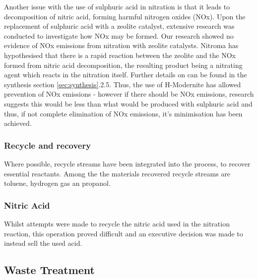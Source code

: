 Another issue with the use of sulphuric acid in nitration is that it leads to decomposition of nitric acid, forming harmful nitrogen oxides (NOx). Upon the replacement of sulphuric acid with a zeolite catalyst, extensive research was conducted to investigate how NOx may be formed. Our research showed no evidence of NOx emissions from nitration with zeolite catalysts. Nitroma has hypothesised that there is a rapid reaction between the zeolite and the NOx formed from nitric acid decomposition, the resulting product being a nitrating agent which reacts in the nitration itself. Further details on can be found in the synthesis section \ref{sec:synthesis}.2.5. Thus, the use of H-Modernite has allowed prevention of NOx emissions - however if there should be NOx emissions, research suggests this would be less than what would be produced with sulphuric acid and thus, if not complete elimination of NOx emissions, it's minimisation has been achieved.  

\subsubsection{Recycle and recovery}

Where possible, recycle streams have been integrated into the process, to recover essential reactants. Among the the materials recovered recycle streams are toluene, hydrogen gas an propanol. 


 

\subsubsection{Nitric Acid}

Whilst attempts were made to recycle the nitric acid used in the nitration reaction, this operation proved difficult and an executive decision was made to instead sell the used acid. 







\subsection{Waste Treatment}

